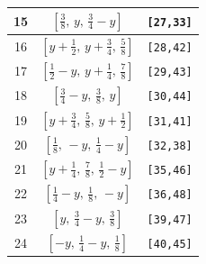 \documentclass[fleqn,8pt]{jsarticle}
\begin{document}
\begin{longtable}{ccc}
15 & $\left[ \frac{3}{8},\, y,\, \frac{3}{4} - y \right]$ & {\tt [27,33]} \\ \hline
16 & $\left[ y + \frac{1}{2},\, y + \frac{3}{4},\, \frac{5}{8} \right]$ & {\tt [28,42]} \\ \hline
17 & $\left[ \frac{1}{2} - y,\, y + \frac{1}{4},\, \frac{7}{8} \right]$ & {\tt [29,43]} \\ \hline
18 & $\left[ \frac{3}{4} - y,\, \frac{3}{8},\, y \right]$ & {\tt [30,44]} \\ \hline
19 & $\left[ y + \frac{3}{4},\, \frac{5}{8},\, y + \frac{1}{2} \right]$ & {\tt [31,41]} \\ \hline
20 & $\left[ \frac{1}{8},\, - y,\, \frac{1}{4} - y \right]$ & {\tt [32,38]} \\ \hline
21 & $\left[ y + \frac{1}{4},\, \frac{7}{8},\, \frac{1}{2} - y \right]$ & {\tt [35,46]} \\ \hline
22 & $\left[ \frac{1}{4} - y,\, \frac{1}{8},\, - y \right]$ & {\tt [36,48]} \\ \hline
23 & $\left[ y,\, \frac{3}{4} - y,\, \frac{3}{8} \right]$ & {\tt [39,47]} \\ \hline
24 & $\left[ - y,\, \frac{1}{4} - y,\, \frac{1}{8} \right]$ & {\tt [40,45]} \\
\end{longtable}
\renewcommand{\arraystretch}{1.2}
\end{document}
